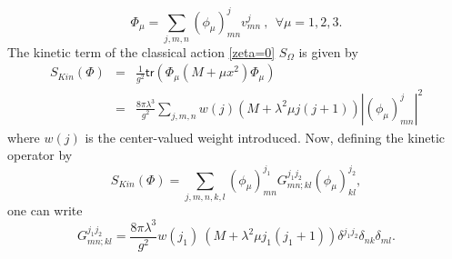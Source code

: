 \documentclass[11pt]{book}
\newcommand{\tr}{\mathsf{tr}}
\theoremstyle{break}
\begin{document}
%
\begin{equation}
\Phi_\mu = \sum_{j,m,n} (\phi_\mu)^j_{mn} v^j_{mn} \ , \ \ \forall \mu=1,2,3.
\end{equation}
%
The kinetic term of the classical action \eqref{zeta=0} $S_\Omega$ is given by%
%
\begin{eqnarray}
S_{Kin}(\Phi) &=& \frac{1}{g^2} \tr( \Phi_\mu (M+\mu x^2) \Phi_\mu)\label{skin} \\
&=& \frac{8\pi\lambda^3}{g^2} \sum_{j,m,n} w(j) (M+\lambda^2\mu j(j+1)) |(\phi_\mu)^j_{mn}|^2 \label{skin-explicit}
\end{eqnarray}
%
where $w(j)$ is the center-valued weight introduced.
Now, defining the kinetic operator by
\begin{equation*}
S_{Kin}(\Phi)=\sum_{j,m,n,k,l}(\phi_\mu)^{j_1}_{mn}G^{j_1j_2}_{mn;kl}(\phi_\mu)^{j_2}_{kl},
\end{equation*}
one can write 
%
\begin{equation}
G^{j_1j_2}_{mn;kl} = \frac{8\pi\lambda^3}{g^2} w(j_1) \ \left(M+\lambda^2\mu j_1(j_1+1)\right) \delta^{j_1j_2} \delta_{nk} \delta_{ml}.\label{eq:kin-op1}
\end{equation}
\end{document}
